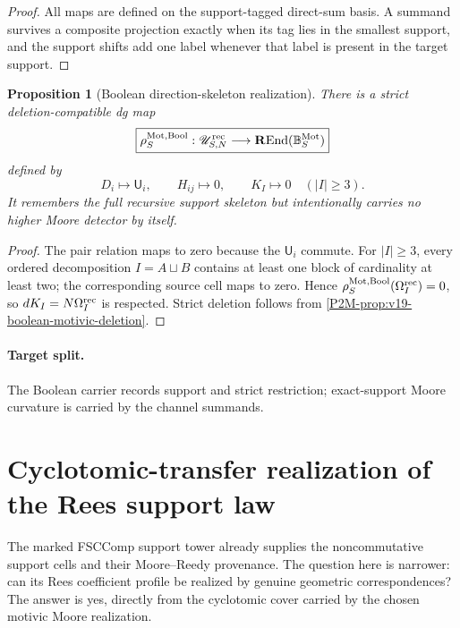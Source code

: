 \documentclass[11pt]{article}
\newtheorem{proposition}[theorem]{Proposition}
\theoremstyle{remark}
\newcommand{\REnd}{\mathbf R\!\operatorname{End}}
\newcommand{\Mot}{\mathrm{Mot}}
\begin{document}
\begin{proof}
All maps are defined on the support-tagged direct-sum basis.  A summand
survives a composite projection exactly when its tag lies in the smallest
support, and the support shifts add one label whenever that label is present
in the target support.
\end{proof}

\begin{proposition}[Boolean direction-skeleton realization]
\label{P2M-prop:v19-boolean-skeleton-realization}
There is a strict deletion-compatible dg map
\begin{equation}
 \boxed{
 \rho_S^{\Mot,\mathrm{Bool}}:
 \mathscr U^{\rm rec}_{S,N}
 \longrightarrow
 \REnd(\mathbb B_S^{\Mot})}
\end{equation}
defined by
\[
 D_i\longmapsto\mathsf U_i,
 \qquad
 H_{ij}\longmapsto0,
 \qquad
 K_I\longmapsto0\quad(|I|\ge3).
\]
It remembers the full recursive support skeleton but intentionally carries no
higher Moore detector by itself.
\end{proposition}

\begin{proof}
The pair relation maps to zero because the $\mathsf U_i$ commute.  For
$|I|\ge3$, every ordered decomposition $I=A\sqcup B$ contains at least one
block of cardinality at least two; the corresponding source cell maps to
zero.  Hence $\rho_S^{\Mot,\mathrm{Bool}}(\Omega_I^{\rm rec})=0$, so
$dK_I=N\Omega_I^{\rm rec}$ is respected.  Strict deletion follows from
\cref{P2M-prop:v19-boolean-motivic-deletion}.
\end{proof}

\paragraph{Target split.}
The Boolean carrier records support and strict restriction; exact-support
Moore curvature is carried by the channel summands.


\section{Cyclotomic-transfer realization of the Rees support law}

The marked FSCComp support tower already supplies the noncommutative support cells and their Moore--Reedy provenance.  The question here is narrower: can its Rees coefficient profile be realized by genuine geometric correspondences?  The answer is yes, directly from the cyclotomic cover carried by the chosen motivic Moore realization.
\end{document}
